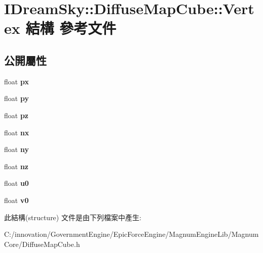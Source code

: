 \hypertarget{struct_i_dream_sky_1_1_diffuse_map_cube_1_1_vertex}{}\section{I\+Dream\+Sky\+:\+:Diffuse\+Map\+Cube\+:\+:Vertex 結構 參考文件}
\label{struct_i_dream_sky_1_1_diffuse_map_cube_1_1_vertex}
\subsection*{公開屬性}
\begin{DoxyCompactItemize}
\item 
float {\bfseries px}\hypertarget{struct_i_dream_sky_1_1_diffuse_map_cube_1_1_vertex_a3fd03396344d50f4e229c6c0e74ef8a3}{}\label{struct_i_dream_sky_1_1_diffuse_map_cube_1_1_vertex_a3fd03396344d50f4e229c6c0e74ef8a3}

\item 
float {\bfseries py}\hypertarget{struct_i_dream_sky_1_1_diffuse_map_cube_1_1_vertex_a20ef9a68071acef92f53506df2a79a3e}{}\label{struct_i_dream_sky_1_1_diffuse_map_cube_1_1_vertex_a20ef9a68071acef92f53506df2a79a3e}

\item 
float {\bfseries pz}\hypertarget{struct_i_dream_sky_1_1_diffuse_map_cube_1_1_vertex_ab0c0fa8deb9dca14da879a0a0fe449ae}{}\label{struct_i_dream_sky_1_1_diffuse_map_cube_1_1_vertex_ab0c0fa8deb9dca14da879a0a0fe449ae}

\item 
float {\bfseries nx}\hypertarget{struct_i_dream_sky_1_1_diffuse_map_cube_1_1_vertex_a5d13b8b74a810ed775fc0aa77744dedc}{}\label{struct_i_dream_sky_1_1_diffuse_map_cube_1_1_vertex_a5d13b8b74a810ed775fc0aa77744dedc}

\item 
float {\bfseries ny}\hypertarget{struct_i_dream_sky_1_1_diffuse_map_cube_1_1_vertex_abc78cf83518a27ed1233ab70cfb99867}{}\label{struct_i_dream_sky_1_1_diffuse_map_cube_1_1_vertex_abc78cf83518a27ed1233ab70cfb99867}

\item 
float {\bfseries nz}\hypertarget{struct_i_dream_sky_1_1_diffuse_map_cube_1_1_vertex_a4efac1dfdd730a48f16267694ee7a3b8}{}\label{struct_i_dream_sky_1_1_diffuse_map_cube_1_1_vertex_a4efac1dfdd730a48f16267694ee7a3b8}

\item 
float {\bfseries u0}\hypertarget{struct_i_dream_sky_1_1_diffuse_map_cube_1_1_vertex_a78c24343bac06f55ec8c0a06ee089636}{}\label{struct_i_dream_sky_1_1_diffuse_map_cube_1_1_vertex_a78c24343bac06f55ec8c0a06ee089636}

\item 
float {\bfseries v0}\hypertarget{struct_i_dream_sky_1_1_diffuse_map_cube_1_1_vertex_a985ae2f175a70d2cf13d41330352a793}{}\label{struct_i_dream_sky_1_1_diffuse_map_cube_1_1_vertex_a985ae2f175a70d2cf13d41330352a793}

\end{DoxyCompactItemize}


此結構(structure) 文件是由下列檔案中產生\+:\begin{DoxyCompactItemize}
\item 
C\+:/innovation/\+Government\+Engine/\+Epic\+Force\+Engine/\+Magnum\+Engine\+Lib/\+Magnum\+Core/Diffuse\+Map\+Cube.\+h\end{DoxyCompactItemize}

